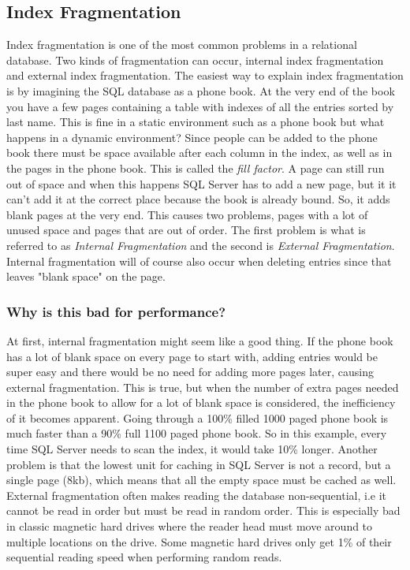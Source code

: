 \documentclass{cslthse-msc}
\begin{document}
\subsection{Index Fragmentation}
Index fragmentation is one of the most common problems in a relational database. Two kinds of fragmentation can occur, internal index fragmentation and external index fragmentation. The easiest way to explain index fragmentation is by imagining the SQL database as a phone book. At the very end of the book you have a few pages containing a table with indexes of all the entries sorted by last name. This is fine in a static environment such as a phone book but what happens in a dynamic environment?
Since people can be added to the phone book there must be space available after each column in the index, as well as in the pages in the phone book. This is called the \emph{fill factor}. A page can still run out of space and when this happens SQL Server has to add a new page, but it it can't add it at the correct place because the book is already bound. So, it adds blank pages at the very end. This causes two problems, pages with a lot of unused space and pages that are out of order. The first problem is what is referred to as \emph{Internal Fragmentation} and the second is \emph{External Fragmentation}. Internal fragmentation will of course also occur when deleting entries since that leaves "blank space" on the page.   \cite{Ozar12}

\subsubsection{Why is this bad for performance?}\label{sec:indexbad}
At first, internal fragmentation might seem like a good thing. If the phone book has a lot of blank space on every page to start with, adding entries would be super easy and there would be no need for adding more pages later, causing external fragmentation. This is true, but when the number of extra pages needed in the phone book to allow for a lot of blank space is considered, the inefficiency of it becomes apparent. Going through a 100\% filled 1000 paged phone book is much faster than a 90\% full 1100 paged phone book. So in this example, every time SQL Server needs to scan the index, it would take 10\% longer. Another problem is that the lowest unit for caching in SQL Server is not a record, but a single page (8kb), which means that all the empty space must be cached as well. \\

External fragmentation often makes reading the database non-sequential, i.e it cannot be read in order but must be read in random order. This is especially bad in classic magnetic hard drives where the reader head must move around to multiple locations on the drive. Some magnetic hard drives only get 1\% of their sequential reading speed when performing random reads.   \cite{Toshiba12}
\end{document}
